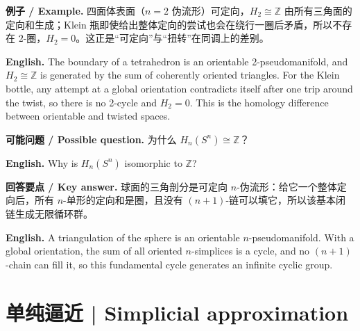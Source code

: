 \documentclass[UTF8,11pt,a4paper]{ctexart}
\newcommand{\EN}[1]{\par\noindent\textbf{English.} #1\par}
\newcommand{\EX}[2]{\par\noindent\textbf{例子 / Example.} #1\par\EN{#2}}
\newcommand{\ASK}[4]{\par\noindent\textbf{可能问题 / Possible question.} #1\par\EN{#2}\noindent\textbf{回答要点 / Key answer.} #3\par\EN{#4}\medskip}
\begin{document}
\EX{四面体表面（$n=2$ 伪流形）可定向，$H_2\cong\mathbb Z$ 由所有三角面的定向和生成；Klein 瓶即使给出整体定向的尝试也会在绕行一圈后矛盾，所以不存在 $2$-圈，$H_2=0$。这正是“可定向”与“扭转”在同调上的差别。}{The boundary of a tetrahedron is an orientable 2-pseudomanifold, and $H_2\cong\mathbb Z$ is generated by the sum of coherently oriented triangles. For the Klein bottle, any attempt at a global orientation contradicts itself after one trip around the twist, so there is no 2-cycle and $H_2=0$. This is the homology difference between orientable and twisted spaces.}

\ASK{为什么 $H_n(S^n)\cong\mathbb Z$？}{Why is $H_n(S^n)$ isomorphic to $\mathbb Z$?}{球面的三角剖分是可定向 $n$-伪流形：给它一个整体定向后，所有 $n$-单形的定向和是圈，且没有 $(n+1)$-链可以填它，所以该基本闭链生成无限循环群。}{A triangulation of the sphere is an orientable $n$-pseudomanifold. With a global orientation, the sum of all oriented $n$-simplices is a cycle, and no $(n+1)$-chain can fill it, so this fundamental cycle generates an infinite cyclic group.}

\section{单纯逼近 | Simplicial approximation}
\end{document}
